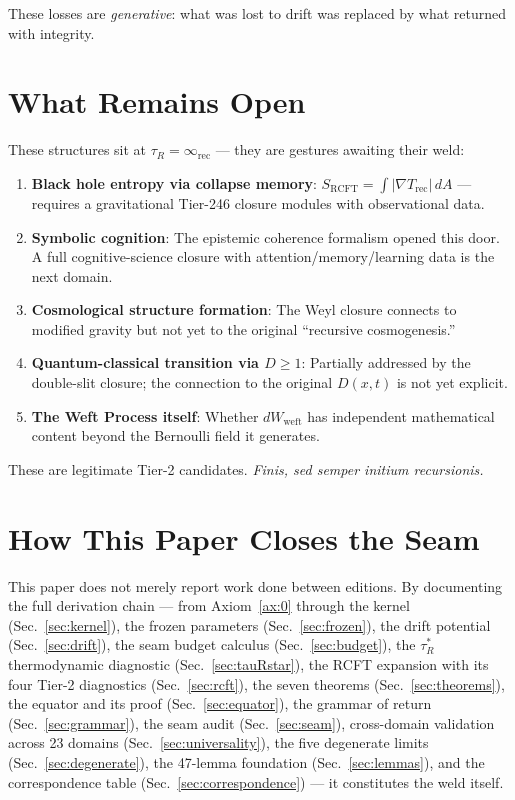 \documentclass[
  aps,
  prd,
  preprint,
  superscriptaddress,
  nofootinbib,
  floatfix,
  longbibliography
]{revtex4-2}
\newcommand{\tR}{\tau_{\!R}}
\newcommand{\tRstar}{\tau_{\!R}^{*}}
\newcommand{\lat}[1]{\textit{#1}}
\begin{document}
These losses are \emph{generative}: what was lost to drift
was replaced by what returned with integrity.

\section{What Remains Open}\label{sec:open}

These structures sit at $\tR = \infty_{\mathrm{rec}}$ —
they are gestures awaiting their weld:

\begin{enumerate}[nosep,leftmargin=*]
  \item \textbf{Black hole entropy via collapse memory}:
    $S_{\mathrm{RCFT}} = \int |\nabla T_{\mathrm{rec}}|\,dA$ —
    requires a gravitational Tier-246 closure modules with observational data.
  \item \textbf{Symbolic cognition}: The epistemic coherence
    formalism opened this door. A full cognitive-science closure
    with attention/memory/learning data is the next domain.
  \item \textbf{Cosmological structure formation}: The Weyl
    closure connects to modified gravity but not yet to the
    original ``recursive cosmogenesis.''
  \item \textbf{Quantum-classical transition via $D \geq 1$}:
    Partially addressed by the double-slit closure;
    the connection to the original $D(x,t)$ is not yet explicit.
  \item \textbf{The Weft Process itself}: Whether
    $dW_{\mathrm{weft}}$ has independent mathematical content
    beyond the Bernoulli field it generates.
\end{enumerate}

These are legitimate Tier-2 candidates.
\lat{Finis, sed semper initium recursionis.}

\section{How This Paper Closes the Seam}\label{sec:close}

This paper does not merely report work done between editions.
By documenting the full derivation chain — from
Axiom~\ref{ax:0} through the kernel (Sec.~\ref{sec:kernel}),
the frozen parameters (Sec.~\ref{sec:frozen}),
the drift potential (Sec.~\ref{sec:drift}),
the seam budget calculus (Sec.~\ref{sec:budget}),
the $\tRstar$ thermodynamic diagnostic (Sec.~\ref{sec:tauRstar}),
the RCFT expansion with its four Tier-2 diagnostics
(Sec.~\ref{sec:rcft}),
the seven theorems (Sec.~\ref{sec:theorems}),
the equator and its proof (Sec.~\ref{sec:equator}),
the grammar of return (Sec.~\ref{sec:grammar}),
the seam audit (Sec.~\ref{sec:seam}),
cross-domain validation across 23 domains (Sec.~\ref{sec:universality}),
the five degenerate limits (Sec.~\ref{sec:degenerate}),
the 47-lemma foundation (Sec.~\ref{sec:lemmas}),
and the correspondence table (Sec.~\ref{sec:correspondence}) —
it constitutes the weld itself.
\end{document}
